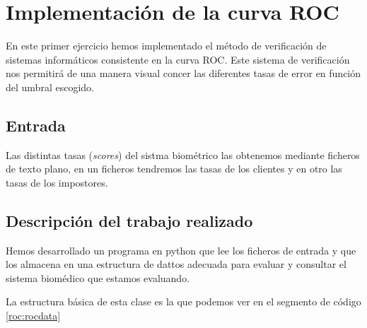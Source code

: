 \section{Implementación de la curva ROC}
En este primer ejercicio hemos implementado el método de verificación de sistemas informáticos consistente en la curva ROC. 
Este sistema de verificación nos permitirá de una manera visual concer las diferentes tasas de error en función del umbral escogido.\par

\subsection{Entrada}
Las distintas tasas (\textit{scores}) del sistma biométrico las obtenemos mediante ficheros de texto plano, en un ficheros tendremos las tasas de los clientes y en otro las tasas de los impostores.\par


\subsection{Descripción del trabajo realizado}
Hemos desarrollado un programa en python que lee los ficheros de entrada y que los almacena en una estructura de dattos adecuada para evaluar y consultar el sistema biomédico que estamos evaluando.\par
La estructura básica de esta clase es la que podemos ver en el segmento de código \ref{roc:rocdata}

